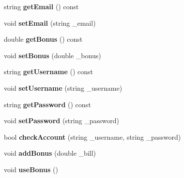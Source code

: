 \begin{DoxyCompactItemize}
\item 
string {\bfseries get\+Email} () const \hypertarget{classCustomer_a9b208d8ac46f8fd1dc5f332a76053cac}{}\label{classCustomer_a9b208d8ac46f8fd1dc5f332a76053cac}

\item 
void {\bfseries set\+Email} (string \+\_\+email)\hypertarget{classCustomer_aff04d3f21f7546c394d28f7b42994719}{}\label{classCustomer_aff04d3f21f7546c394d28f7b42994719}

\item 
double {\bfseries get\+Bonus} () const \hypertarget{classCustomer_aac2333a5e45561cdc22d2aa6716c0985}{}\label{classCustomer_aac2333a5e45561cdc22d2aa6716c0985}

\item 
void {\bfseries set\+Bonus} (double \+\_\+bonus)\hypertarget{classCustomer_af983714f01880a3f082c60443fcea84d}{}\label{classCustomer_af983714f01880a3f082c60443fcea84d}

\item 
string {\bfseries get\+Username} () const \hypertarget{classCustomer_a1239d270135d75ee010f9775b07e2aa0}{}\label{classCustomer_a1239d270135d75ee010f9775b07e2aa0}

\item 
void {\bfseries set\+Username} (string \+\_\+username)\hypertarget{classCustomer_ab794d5fb843d86eeb79c79dab75302f6}{}\label{classCustomer_ab794d5fb843d86eeb79c79dab75302f6}

\item 
string {\bfseries get\+Password} () const \hypertarget{classCustomer_a452b009754c24527545ed040a9bedb0b}{}\label{classCustomer_a452b009754c24527545ed040a9bedb0b}

\item 
void {\bfseries set\+Password} (string \+\_\+password)\hypertarget{classCustomer_a87953a93ed8a81f9835d26d2ecf3742a}{}\label{classCustomer_a87953a93ed8a81f9835d26d2ecf3742a}

\item 
bool {\bfseries check\+Account} (string \+\_\+username, string \+\_\+password)\hypertarget{classCustomer_ae1e9fb03ed6179ecbcd6c0212bc7de17}{}\label{classCustomer_ae1e9fb03ed6179ecbcd6c0212bc7de17}

\item 
void {\bfseries add\+Bonus} (double \+\_\+bill)\hypertarget{classCustomer_a6bd365c7ee7c4807de7e0fb94b4a9687}{}\label{classCustomer_a6bd365c7ee7c4807de7e0fb94b4a9687}

\item 
void {\bfseries use\+Bonus} ()\hypertarget{classCustomer_ab5a0e54395ef83bef1f51a3a98b30ec4}{}\label{classCustomer_ab5a0e54395ef83bef1f51a3a98b30ec4}

\end{DoxyCompactItemize}
